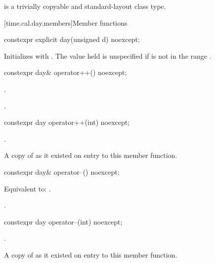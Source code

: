 \pnum
{} is a trivially copyable and standard-layout class type.

[time.cal.day.members]{Member functions}

%
\begin{itemdecl}
constexpr explicit day(unsigned d) noexcept;
\end{itemdecl}

\begin{itemdescr}
\pnum
\effects
Initializes  with .
The value held is unspecified if  is not in the range .
\end{itemdescr}

%
\begin{itemdecl}
constexpr day& operator++() noexcept;
\end{itemdecl}

\begin{itemdescr}
\pnum
\effects
{}.

\pnum
\returns
{}.
\end{itemdescr}

%
\begin{itemdecl}
constexpr day operator++(int) noexcept;
\end{itemdecl}

\begin{itemdescr}
\pnum
\effects
{}.

\pnum
\returns
A copy of  as it existed on entry to this member function.
\end{itemdescr}

%
\begin{itemdecl}
constexpr day& operator--() noexcept;
\end{itemdecl}

\begin{itemdescr}
\pnum
\effects
Equivalent to: .

\pnum
\returns
{}.
\end{itemdescr}

%
\begin{itemdecl}
constexpr day operator--(int) noexcept;
\end{itemdecl}

\begin{itemdescr}
\pnum
\effects
{}.

\pnum
\returns
A copy of  as it existed on entry to this member function.
\end{itemdescr}

